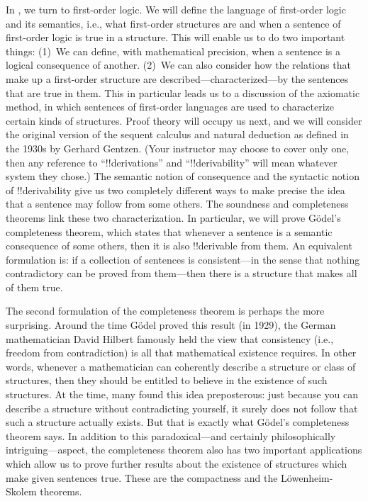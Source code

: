 In , we turn to first-order logic. We will define
the language of first-order logic and its semantics, i.e., what
first-order structures are and when a sentence of first-order logic is
true in a structure. This will enable us to do two important things:
(1)~We can define, with mathematical precision, when a sentence is a
logical consequence of another. (2)~We can also consider how the
relations that make up a first-order structure are
described---characterized---by the sentences that are true in them.
This in particular leads us to a discussion of the axiomatic method,
in which sentences of first-order languages are used to characterize
certain kinds of structures. Proof theory will occupy us next, and we
will consider the original version of the sequent calculus and natural
deduction as defined in the 1930s by Gerhard Gentzen. (Your instructor
may choose to cover only one, then any reference to
``!!{derivation}s'' and ``!!{derivability}'' will mean whatever system
they chose.) The semantic notion of consequence and the syntactic
notion of !!{derivability} give us two completely different ways to
make precise the idea that a sentence may follow from some others. The
soundness and completeness theorems link these two characterization.
In particular, we will prove G\"odel's completeness theorem, which
states that whenever a sentence is a semantic consequence of some
others, then it is also !!{derivable} from them. An equivalent
formulation is: if a collection of sentences is consistent---in the
sense that nothing contradictory can be proved from them---then there
is a structure that makes all of them true.

The second formulation of the completeness theorem is perhaps the more
surprising. Around the time G\"odel proved this result (in 1929), the
German mathematician David Hilbert famously held the view that
consistency (i.e., freedom from contradiction) is all that mathematical
existence requires. In other words, whenever a mathematician can
coherently describe a structure or class of structures, then they
should be entitled to believe in the existence of such structures.
At the time, many found this idea preposterous: just because you can
describe a structure without contradicting yourself, it surely does
not follow that such a structure actually exists. But that is exactly
what G\"odel's completeness theorem says. In addition to this
paradoxical---and certainly philosophically intriguing---aspect, the
completeness theorem also has two important applications which allow
us to prove further results about the existence of structures which
make given sentences true. These are the compactness and the
L\"owenheim-Skolem theorems.

